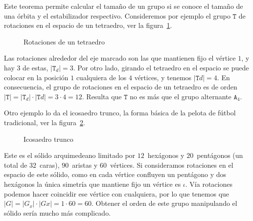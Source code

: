   Este teorema permite calcular el tamaño de un grupo
  si se conoce el tamaño de una órbita
  y el estabilizador respectivo.
  Consideremos por ejemplo el grupo \(\mathtt{T}\)
  de rotaciones en el espacio de un tetraedro,%
  ver la figura~\ref{fig:rotaciones-tetraedro-1}.
  \begin{figure}[htbp]
    \centering
    \caption{Rotaciones de un tetraedro}
    \label{fig:rotaciones-tetraedro-1}
  \end{figure}
  Las rotaciones alrededor del eje marcado
  son las que mantienen fijo el vértice \(1\),
  y hay \(3\) de estas,
  \(\lvert \mathtt{T}_d \rvert = 3\).
  Por otro lado,
  girando el tetraedro en el espacio
  se puede colocar en la posición \(1\)
  cualquiera de los \(4\) vértices,
  y tenemos \(\lvert \mathtt{T} d \rvert = 4\).
  En consecuencia,
  el grupo de rotaciones en el espacio de un tetraedro es
  de orden
  \(\lvert \mathtt{T} \rvert
      = \lvert \mathtt{T}_d \rvert
	  \cdot \lvert \mathtt{T} d \rvert
      = 3 \cdot 4
      = 12\).
  Resulta que \(\mathtt{T}\)
  no es más que el grupo alternante \(\mathtt{A}_4\).%

  Otro ejemplo lo da el icosaedro trunco,%
  la forma básica de la pelota de fútbol tradicional,
  ver la figura~\ref{fig:icosaedro-trunco}.
  \begin{figure}[htbp]
    \centering
    \caption{Icosaedro trunco}
    \label{fig:icosaedro-trunco}
  \end{figure}
  Este es el sólido arquimedeano%
  limitado por \(12\)~hexágonos y \(20\)~pentágonos%
  (un total de \(32\)~caras),
  \(90\)~aristas y \(60\)~vértices.
  Si consideramos rotaciones en el espacio de este sólido,
  como en cada vértice confluyen un pentágono y dos hexágonos
  la única simetría
  que mantiene fijo un vértice es \(\iota\).
  Vía rotaciones podemos hacer coincidir ese vértice con cualquiera,
  por lo que tenemos
  que \(\lvert G \rvert
	  = \lvert G_x \rvert \cdot \lvert G x \rvert
	  = 1 \cdot 60
	  = 60\).
  Obtener el orden de este grupo manipulando el sólido
  sería mucho más complicado.

